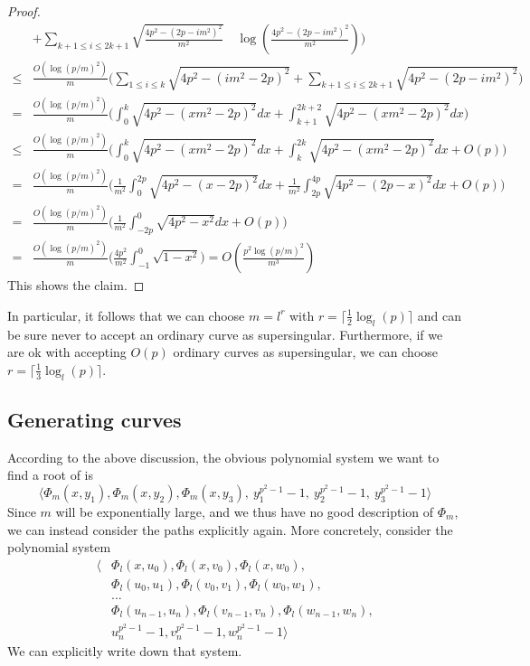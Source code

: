 \begin{proof}
\begin{align*}
        &+ \sum_{k + 1 \leq i \leq 2k + 1} \sqrt{ \frac {4p^2 - (2p - im^2)^2} {m^2}} \quad \log\left( \frac {4p^2 - (2p - im^2)^2} {m^2} \right) \Biggr) \\
        \leq& \frac {O(\log(p/m)^2)} {m} \Biggl( \sum_{1 \leq i \leq k} \sqrt{4p^2 - (im^2 - 2p)^2} + \sum_{k + 1 \leq i \leq 2k + 1} \sqrt{4p^2 - (2p - im^2)^2} \Biggr) \\
        =& \frac {O(\log(p/m)^2)} {m} \Biggl( \int_0^k \sqrt{4p^2 - (xm^2 - 2p)^2} dx + \int_{k + 1}^{2k + 2} \sqrt{4p^2 - (xm^2 - 2p)^2} dx \Biggr) \\
        \leq& \frac {O(\log(p/m)^2)} {m} \Biggl( \int_0^k \sqrt{4p^2 - (xm^2 - 2p)^2} dx + \int_{k}^{2k} \sqrt{4p^2 - (xm^2 - 2p)^2} dx + O(p) \Biggr) \\
        =& \frac {O(\log(p/m)^2)} {m} \Biggl( \frac 1 {m^2} \int_0^{2p} \sqrt{4p^2 - (x - 2p)^2} dx + \frac 1 {m^2} \int_{2p}^{4p } \sqrt{4p^2 - (2p - x)^2} dx + O(p)\Biggr) \\
        =& \frac {O(\log(p/m)^2)} {m} \Biggl( \frac 1 {m^2} \int_{-2p}^0 \sqrt{4p^2 - x^2} dx + O(p) \Biggr) \\
        =& \frac {O(\log(p/m)^2)} {m} \Biggl( \frac {4p^2} {m^2} \int_{-1}^0 \sqrt{1 - x^2} \Biggr) = O\left( \frac {p^2\log(p/m)^2} {m^3} \right)
    \end{align*}
    This shows the claim.
\end{proof}
In particular, it follows that we can choose $m = l^r$ with $r = \lceil \frac 1 2 \log_l(p) \rceil$ and can be sure never to accept an ordinary curve as supersingular.
Furthermore, if we are ok with accepting $O(p)$ ordinary curves as supersingular, we can choose $r = \lceil \frac 1 3 \log_l(p) \rceil$.

\subsection{Generating curves}
According to the above discussion, the obvious polynomial system we want to find a root of is
\begin{equation*}
    \langle \Phi_m(x, y_1), \Phi_m(x, y_2), \Phi_m(x, y_3), \ y_1^{p^2 - 1} - 1, \ y_2^{p^2 - 1} - 1, \ y_3^{p^2 - 1} - 1 \rangle
\end{equation*}
Since $m$ will be exponentially large, and we thus have no good description of $\Phi_m$, we can instead consider the paths explicitly again.
More concretely, consider the polynomial system
\begin{align*}
    \langle &\Phi_l(x, u_0), \Phi_l(x, v_0), \Phi_l(x, w_0), \\
    &\Phi_l(u_0, u_1), \Phi_l(v_0, v_1), \Phi_l(w_0, w_1), \\
    &... \\
    &\Phi_l(u_{n - 1}, u_n), \Phi_l(v_{n - 1}, v_n), \Phi_l(w_{n - 1}, w_n), \\
    &u_n^{p^2 - 1} - 1, v_n^{p^2 - 1} - 1, w_n^{p^2 - 1} - 1 \rangle
\end{align*}
We can explicitly write down that system.

